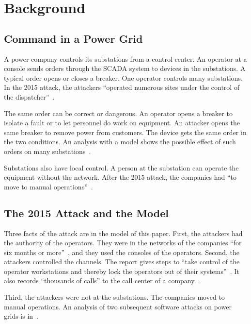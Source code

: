 \section{Background}
\label{sec:background}

\subsection{Command in a Power Grid}

A power company controls its substations from a control center. An operator at a console
sends orders through the SCADA system to devices in the substations. A typical order opens
or closes a breaker. One operator controls many substations. In the 2015 attack, the
attackers ``operated numerous sites under the control of the
dispatcher''~\cite[p.~14]{eisac2016ukraine}.

The same order can be correct or dangerous. An operator opens a breaker to isolate a fault
or to let personnel do work on equipment. An attacker opens the same breaker to remove
power from customers. The device gets the same order in the two conditions. An analysis
with a model shows the possible effect of such orders on many substations~\cite{ten2018impact}.

Substations also have local control. A person at the substation can operate the equipment
without the network. After the 2015 attack, the companies had ``to move to manual
operations''~\cite[p.~v]{eisac2016ukraine}. 

\subsection{The 2015 Attack and the Model}

Three facts of the attack are in the model of this paper. First, the attackers had the
authority of the operators. They were in the networks of the companies ``for six months or
more''~\cite[p.~3]{eisac2016ukraine}, and they used the consoles of the operators. Second,
the attackers controlled the channels. The report gives steps to ``take control of the
operator workstations and thereby lock the operators out of their
systems''~\cite[p.~8]{eisac2016ukraine}. It also records ``thousands of calls'' to the
call center of a company~\cite[p.~2]{eisac2016ukraine}.

Third, the attackers were not at the substations. The companies moved to manual operations.
An analysis of two subsequent software attacks on power grids is
in~\cite{salazar2024industroyers}.

